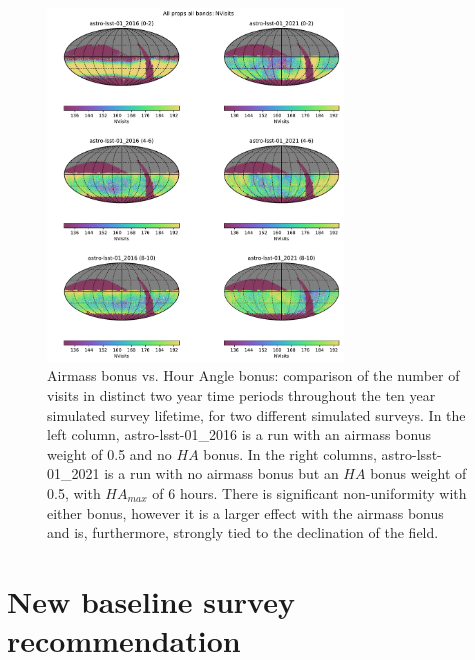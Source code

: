 \documentclass[DM,authoryear,toc]{lsstdoc}
\begin{document}
\begin{figure}[ht]
\centering
\includegraphics[width=0.7\textwidth]{figures/nvisits_comp_maps}
\caption{Airmass bonus vs. Hour Angle bonus: comparison of the number of visits in distinct two year time periods throughout the ten year simulated survey lifetime, for two different simulated surveys. In the left column, astro-lsst-01\_2016 is a run with an airmass bonus weight of 0.5 and no $HA$ bonus. In the right columns, astro-lsst-01\_2021 is a run with no airmass bonus but an $HA$ bonus weight of 0.5, with $HA_{max}$ of 6 hours. There is significant non-uniformity with either bonus, however it is a larger effect with the airmass bonus and is, furthermore, strongly tied to the declination of the field.
\label{fig:nvisits_comp_maps}}
\end{figure}


\section{New baseline survey recommendation}
\end{document}
